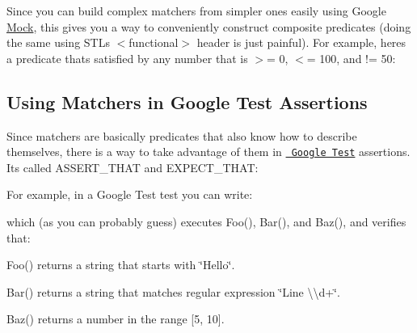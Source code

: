 Since you can build complex matchers from simpler ones easily using Google \mbox{\hyperlink{classMock}{Mock}}, this gives you a way to conveniently construct composite predicates (doing the same using S\+TL\textquotesingle{}s {\ttfamily $<$functional$>$} header is just painful). For example, here\textquotesingle{}s a predicate that\textquotesingle{}s satisfied by any number that is $>$= 0, $<$= 100, and != 50\+:


\begin{DoxyCode}{0}
\end{DoxyCode}


\subsection*{Using Matchers in Google Test Assertions}

Since matchers are basically predicates that also know how to describe themselves, there is a way to take advantage of them in \href{../../googletest/}{\texttt{ Google Test}} assertions. It\textquotesingle{}s called {\ttfamily A\+S\+S\+E\+R\+T\+\_\+\+T\+H\+AT} and {\ttfamily E\+X\+P\+E\+C\+T\+\_\+\+T\+H\+AT}\+:


\begin{DoxyCode}{0}
\end{DoxyCode}


For example, in a Google Test test you can write\+:


\begin{DoxyCode}{0}
\DoxyCodeLine{}
\DoxyCodeLine{}
\end{DoxyCode}


which (as you can probably guess) executes {\ttfamily Foo()}, {\ttfamily Bar()}, and {\ttfamily Baz()}, and verifies that\+:


\begin{DoxyItemize}
\item {\ttfamily Foo()} returns a string that starts with {\ttfamily \char`\"{}\+Hello\char`\"{}}.
\item {\ttfamily Bar()} returns a string that matches regular expression {\ttfamily \char`\"{}\+Line \textbackslash{}\textbackslash{}d+\char`\"{}}.
\item {\ttfamily Baz()} returns a number in the range \mbox{[}5, 10\mbox{]}.
\end{DoxyItemize}


